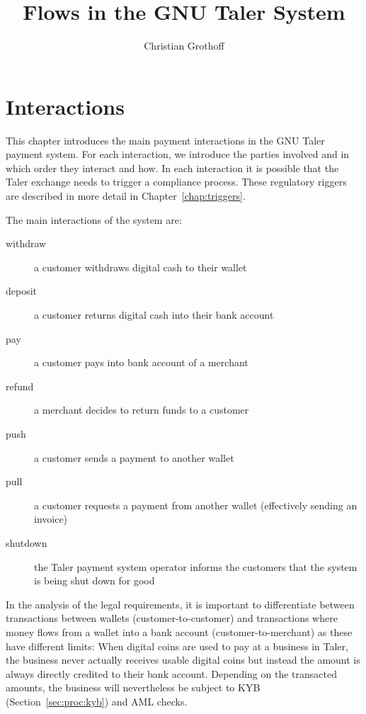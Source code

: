 \documentclass[10pt,a4paper,oneside]{book}
\author{Christian Grothoff}
\title{Flows in the GNU Taler System}
\begin{document}
\maketitle
\tableofcontents

\chapter{Interactions} \label{chap:interactions}

This chapter introduces the main payment interactions in the GNU Taler payment
system. For each interaction, we introduce the parties involved and in which
order they interact and how.  In each interaction it is possible that the
Taler exchange needs to trigger a compliance process.  These regulatory
riggers are described in more detail in Chapter~\ref{chap:triggers}.

The main interactions of the system are:

\begin{description}
  \item[withdraw] a customer withdraws digital cash to their wallet
  \item[deposit] a customer returns digital cash into their bank account
  \item[pay] a customer pays into bank account of a merchant
  \item[refund] a merchant decides to return funds to a customer
  \item[push] a customer sends a payment to another wallet
  \item[pull] a customer requests a payment from another wallet (effectively sending an invoice)
  \item[shutdown] the Taler payment system operator informs the customers that the system is being shut down for good
\end{description}

In the analysis of the legal requirements, it is important to differentiate
between transactions between wallets (customer-to-customer) and transactions
where money flows from a wallet into a bank account (customer-to-merchant) as
these have different limits: When digital coins are used to pay at a business in
Taler, the business never actually receives usable digital coins but instead
the amount is always directly credited to their bank account.  Depending on
the transacted amounts, the business will nevertheless be subject to KYB
(Section~\ref{sec:proc:kyb}) and AML checks.
\end{document}
